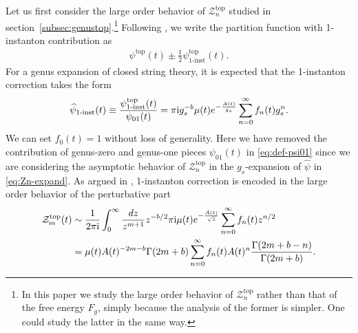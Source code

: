 \documentclass[11pt]{article}
\newcommand{\ri}{{\rm i}}
\newcommand{\hf}{\frac{1}{2}}
\def\h#1{\widehat{#1}}
\def\Ga{\Gamma}
\def\rt#1{\sqrt{#1}}
\newcommand{\Ztop}{\mathcal{Z}^{\text{top}}}
\renewcommand{\[}{\begin{eqnarray}}
\renewcommand{\]}{\end{eqnarray}}
\newcommand{\Atop}{A}
\newcommand{\btop}{b}
\newcommand{\ftop}{f}
\newcommand{\mutop}{\mu}
\begin{document}
Let us first consider the large order behavior of $\Ztop_n$
studied in section~\ref{subsec:genustop}.\footnote{
In this paper we study the large order behavior of
$\Ztop_n$ rather than that of the free energy $F_g$,
simply because the analysis of the former is simpler.
One could study the latter in the same way.}
Following \cite{Marino:2007te},
we write the partition function
with 1-instanton contribution as
%
\begin{align}
\psi^{\text{top}}(t)\pm \hf \psi^{\text{top}}_{\text{1-inst}}(t).
\label{eq:psi+inst}
\end{align}
%
For a genus expansion of closed string theory,
it is expected that the 1-instanton correction
takes the form
%
\begin{align}
 \h{\psi}_{\text{1-inst}}(t)
\equiv\frac{\psi^{\text{top}}_{\text{1-inst}}(t)}{\psi_{01}(t)}
=\pi\ri g_s^{-\btop}\mu(t)e^{-\frac{\Atop(t)}{g_s}}\sum_{n=0}^\infty f_n(t)g_s^n.
\label{eq:Z1-cn}
\end{align}
We can set $f_0(t)=1$ without loss of generality.
Here we have removed the contribution of
genus-zero and genus-one pieces $\psi_{01}(t)$
in \eqref{eq:def-psi01} since we are considering the
asymptotic behavior of $\Ztop_n$ in the $g_s$-expansion of
$\h{\psi}$
in \eqref{eq:Zn-expand}.
%
As argued in \cite{Marino:2007te}, 1-instanton correction is encoded in
the large order behavior of the perturbative part
%
\begin{align}
\begin{aligned}
 \Ztop_m(t)
&\sim\frac{1}{2\pi\ri}\int_0^\infty \frac{dz}{z^{m+1}}z^{-\btop/2}
 \pi \ri \mu(t)e^{-\frac{\Atop(t)}{\rt{z}}}\sum_{n=0}^\infty
 f_n(t)z^{n/2}\\
&=\mutop(t) \Atop(t)^{-2m-\btop}\Ga(2m+\btop)\sum_{n=0}^\infty
  \ftop_n(t) \Atop(t)^n\frac{\Ga(2m+\btop-n)}{\Ga(2m+\btop)}.
\end{aligned}
\label{eq:Ztop-asymp}
\end{align}
%
\end{document}
